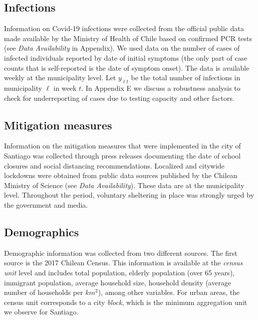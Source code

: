 \subsection{Infections} 

Information on Covid-19 infections were  collected from the official public data made available by the Ministry of Health of Chile based on confirmed PCR tests (see \textit{Data Availability} in Appendix). We used data on the number of cases of infected individuals reported by date of initial symptoms (the only part of case counts that is self-reported is the date of symptom onset). The data is available weekly at the municipality level. Let $y_{\ell t}$ be the total number of infections in municipality $\ell$ in week $t$. In Appendix E we discuss a robustness analysis to check for underreporting of cases due to testing capacity and other factors.

\subsection{Mitigation measures} 

Information on the mitigation measures that were implemented in the city of Santiago was collected through press releases documenting the date of school closures and social distancing recommendations. Localized and citywide lockdowns were obtained from public data sources published by the Chilean Ministry of Science (see \textit{Data Availability}). These data are at the municipality level. Throughout the period, voluntary sheltering in place was strongly urged by the government and media.

\subsection{Demographics} 

Demographic information was collected from two different sources. The first source is the 2017 Chilean Census. This information is  available at the \emph{census unit} level and includes total population, elderly population (over 65 years), immigrant population, average household size, household density (average number of households per $km^{2}$), among other variables. For urban areas, the census unit corresponds to a city \emph{block}, which is the minimum aggregation unit we observe for Santiago. 

